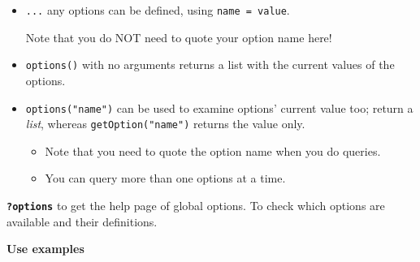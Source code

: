 \documentclass[
  a4paper,
  twoside,
  openright]{book}
\newenvironment{Shaded}{\begin{snugshade}}{\end{snugshade}}
\newcommand{\DecValTok}[1]{\textcolor[rgb]{0.00,0.00,0.81}{#1}}
\newcommand{\FunctionTok}[1]{\textcolor[rgb]{0.13,0.29,0.53}{\textbf{#1}}}
\newcommand{\NormalTok}[1]{#1}
\newcommand{\SpecialCharTok}[1]{\textcolor[rgb]{0.81,0.36,0.00}{\textbf{#1}}}
\newcommand{\StringTok}[1]{\textcolor[rgb]{0.31,0.60,0.02}{#1}}
\theoremstyle{definition}
\theoremstyle{definition}
\theoremstyle{definition}
\theoremstyle{definition}
\theoremstyle{remark}
\begin{document}
\begin{itemize}
\item
  \texttt{...} any options can be defined, using \texttt{name\ =\ value}.

  Note that you do {NOT need to quote your option name} here!
\item
  \texttt{options()} with no arguments returns a list with the current values of the options.
\item
  \texttt{options("name")} can be used to examine options' current value too; return a \emph{list}, whereas \texttt{getOption("name")} returns the value only.

  \begin{itemize}
  \item
    Note that you need to quote the option name when you do queries.
  \item
    You can query more than one options at a time.

\begin{Shaded}
\end{Shaded}
  \end{itemize}
\end{itemize}

\textbf{\texttt{?options}} to get the help page of global options. To check which options are available and their definitions.

\textbf{Use examples}
\end{document}
